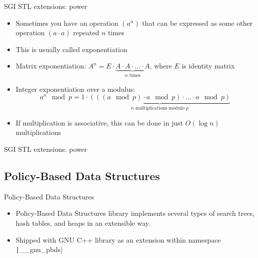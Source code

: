 \documentclass[12pt,presentation,hyperref={unicode},aspectratio=169]{beamer}
\begin{document}
\begin{frame}{SGI STL extensions: power}
  \begin{itemize}
    \item<1-> Sometimes you have an operation $(a^n)$ that can be
      expressed as some other operation $(a \cdot a)$ repeated $n$ times
    \item<1-> This is usually called exponentiation

    \item<2-> Matrix exponentiation:
      $A^n = E
        \cdot \underbrace{A \cdot A \cdot \ldots \cdot A}_{n \text{ times}}$,
        where $E$ is identity matrix
    \item<2-> Integer exponentiation over a modulus: $$
      a^n \mod{p} = 1
      \cdot \underbrace{(((a \mod{p}) \cdot a \mod{p}) \cdot
      \ldots \cdot a \mod{p})}_{n\text{ multiplications modulo }p}
    $$

    \item<3-> If multiplication is associative, this can be done in just
      $O(\log{n})$ multiplications
  \end{itemize}
\end{frame}

\begin{frame}[fragile]{SGI STL extensions: power}
\end{frame}


\subsection{Policy-Based Data Structures}

\begin{frame}[fragile]{Policy-Based Data Structures}
  \begin{itemize}
    \item<1-> Policy-Based Data Structures library implements several types of
      search trees, hash tables, and heaps in an extensible way.
    \item<2-> Shipped with GNU C++ library as an
      extension within namespace
      \texttt|__gnu_pbds|
  \end{itemize}
\end{frame}
\end{document}
